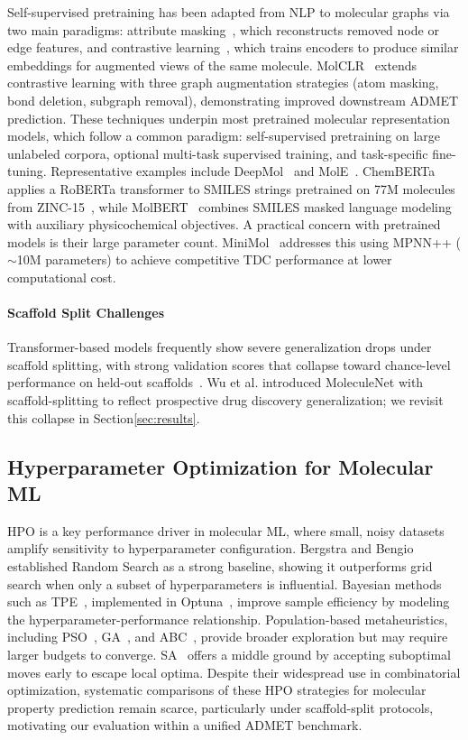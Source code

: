 \documentclass[journal]{IEEEtran}
\begin{document}
Self-supervised pretraining has been adapted from NLP to molecular graphs via two main paradigms: attribute masking~\cite{attrMasking}, which reconstructs removed node or edge features, and contrastive learning~\cite{contrativeLearning}, which trains encoders to produce similar embeddings for augmented views of the same molecule. MolCLR~\cite{molclr} extends contrastive learning with three graph augmentation strategies (atom masking, bond deletion, subgraph removal), demonstrating improved downstream ADMET prediction. These techniques underpin most pretrained molecular representation models, which follow a common paradigm: self-supervised pretraining on large unlabeled corpora, optional multi-task supervised training, and task-specific fine-tuning. Representative examples include DeepMol~\cite{deepMol} and MolE~\cite{molE}. ChemBERTa~\cite{chemberta2} applies a RoBERTa transformer to SMILES strings pretrained on 77M molecules from ZINC-15~\cite{sterling2015zinc15}, while MolBERT~\cite{molbert} combines SMILES masked language modeling with auxiliary physicochemical objectives. A practical concern with pretrained models is their large parameter count. MiniMol~\cite{miniMol} addresses this using MPNN++ ($\sim$10M parameters) to achieve competitive TDC performance at lower computational cost.

\paragraph{Scaffold Split Challenges}
Transformer-based models frequently show severe generalization drops under scaffold splitting, with strong validation scores that collapse toward chance-level performance on held-out scaffolds~\cite{yang2019dmpnn,chemberta2}. Wu et al.\cite{wu2018moleculenet} introduced MoleculeNet with scaffold-splitting to reflect prospective drug discovery generalization; we revisit this collapse in Section\ref{sec:results}.

\subsection{Hyperparameter Optimization for Molecular ML}

HPO is a key performance driver in molecular ML, where small, noisy datasets amplify sensitivity to hyperparameter configuration. Bergstra and Bengio~\cite{bergstra2012random} established Random Search as a strong baseline, showing it outperforms grid search when only a subset of hyperparameters is influential. Bayesian methods such as TPE~\cite{bergstra2011tpe}, implemented in Optuna~\cite{akiba2019optuna}, improve sample efficiency by modeling the hyperparameter-performance relationship. Population-based metaheuristics, including PSO~\cite{kennedy1995pso}, GA~\cite{holland1975ga}, and ABC~\cite{karaboga2005abc}, provide broader exploration but may require larger budgets to converge. SA~\cite{saopt} offers a middle ground by accepting suboptimal moves early to escape local optima. Despite their widespread use in combinatorial optimization, systematic comparisons of these HPO strategies for molecular property prediction remain scarce, particularly under scaffold-split protocols, motivating our evaluation within a unified ADMET benchmark.
\end{document}
